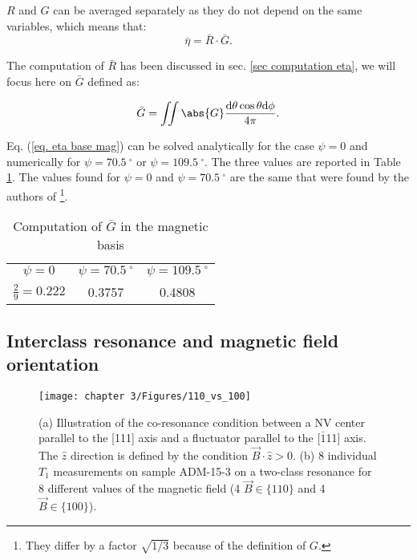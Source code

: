 \documentclass[a4paper, 11pt]{report}
\begin{document}
$R$ and $G$ can be averaged separately as they do not depend on the same variables, which means that:
\begin{equation}
\label{eq. eta bar r bar g bar}
\bar \eta = \bar R \cdot \bar G.
\end{equation} 

The computation of $\bar{R}$ has been discussed in sec. \ref{sec computation eta}, we will focus here on $\bar{G}$ defined as:

\begin{equation}
\label{eq. eta base mag}
\bar{G}= \iint \abs{G} \frac{\rm d\theta \cos \theta \rm d\phi}{4 \pi}.
\end{equation}

Eq. (\ref{eq. eta base mag}) can be solved analytically for the case $\psi=0$ and numerically for $\psi=70.5 \ ^\circ$ or $\psi=109.5 \ ^\circ$. The three values are reported in Table \ref{table G mag}. The values found for $\psi=0$ and $\psi=70.5 \ ^\circ$ are the same that were found by the authors of \citep{choi2017depolarization} \footnote{They differ by a factor $\sqrt{1/3}$ because of the definition of $G$.}.

\begin{table}[htbp]
\centering
\caption{Computation of $\bar G$ in the magnetic basis}
 \label{table G mag}
\begin{tabular}{c|c|c}
\toprule
$\psi=0$ & $\psi=70.5 \ ^\circ$ & $\psi=109.5 \ ^\circ$ \\

$\frac{2}{9}=0.222$ & 0.3757 & 0.4808 \\
\bottomrule
\end{tabular}
\end{table}

\subsection{Interclass resonance and magnetic field orientation}

\begin{figure}[h!]
\centering
\texttt{[image: chapter 3/Figures/110\_vs\_100]}
\caption{(a) Illustration of the co-resonance condition between a NV center parallel to the [111] axis and a fluctuator parallel to the [$\bar 1$11] axis. The $\hat z$ direction is defined by the condition $\vec{B}\cdot\hat{z} >0$. (b) 8 individual $T_1$ measurements on sample ADM-15-3 on a two-class resonance for 8 different values of the magnetic field (4 $\vec{B} \in \{110\}$ and 4 $\vec{B} \in \{100\}$).}
\label{110 vs 100 annexe}
\end{figure}
\end{document}
